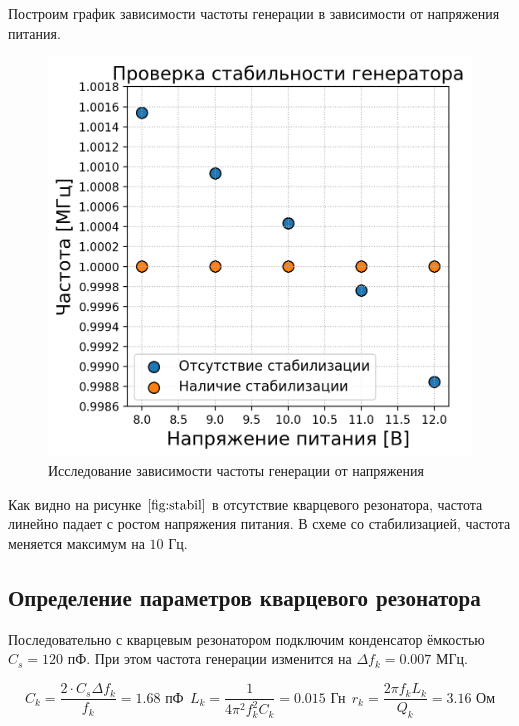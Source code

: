 \documentclass[a4paper, 14pt]{extarticle}
\begin{document}
Построим график зависимости частоты генерации в зависимости от напряжения питания.

\begin{figure}[htbp]
    \centering
    \includegraphics[width = 0.5 \textwidth]{stabil.png}
    \caption{Исследование зависимости частоты генерации от напряжения}
    \label{fig:stabil}
\end{figure}

Как видно на рисунке $\ref{fig:stabil}$ в отсутствие кварцевого резонатора, 
частота линейно падает с ростом напряжения питания. В схеме со стабилизацией,
частота меняется максимум на $10 \text{ Гц}$.  

\subsection*{\textcolor{sub_header}{Определение параметров кварцевого резонатора}}

Последовательно с кварцевым резонатором подключим конденсатор ёмкостью $C_{s} = 120 \text{ пФ}$.
При этом частота генерации изменится на $\Delta f_{k} = 0.007 \text{ МГц}$. 

\begin{equation*}
C_{k} = \frac{2 \cdot C_{s} \Delta f_{k}}{f_{k}} = 1.68 \text{ пФ}
\ \
L_{k} = \frac{1}{4 \pi^{2} f_{k}^{2} C_{k}} = 0.015 \text{ Гн}
\ \ 
r_{k} = \frac{2 \pi f_{k} L_{k}}{Q_{k}} = 3.16 \text{ Ом}
\end{equation*}
\end{document}
